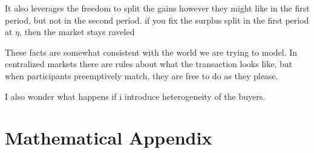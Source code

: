 \documentclass[AER]{AEA}
\begin{document}
It also leverages the freedom to split the gains however they might like in the first period, but not in the second period.  if you fix the surplus split in the first period at $\eta$, then the market stays raveled

These facts are somewhat consistent with the world we are trying to model.  In centralized markets there are rules about what the transaction looks like, but when participants preemptively match, they are free to do as they please.

I also wonder what happens if i introduce heterogeneity of the buyers.  



\appendix

\section{Mathematical Appendix}
\end{document}
